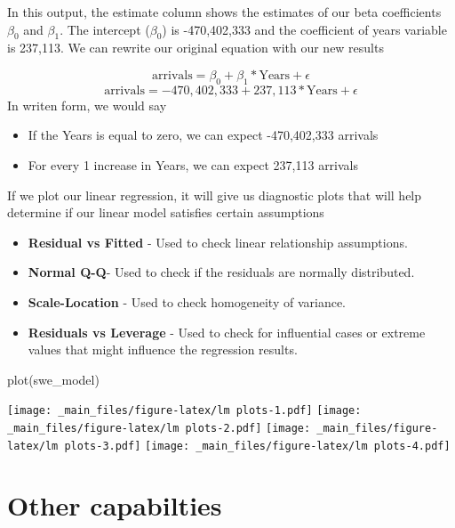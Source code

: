 \documentclass[
]{book}
\newenvironment{Shaded}{\begin{snugshade}}{\end{snugshade}}
\newcommand{\FunctionTok}[1]{\textcolor[rgb]{0.00,0.00,0.00}{#1}}
\newcommand{\NormalTok}[1]{#1}
\providecommand{\tightlist}{%
  \setlength{\itemsep}{0pt}\setlength{\parskip}{0pt}}
\begin{document}
In this output, the estimate column shows the estimates of our beta coefficients \(\beta_0\) and \(\beta_1\).
The intercept (\(\beta_0\)) is -470,402,333 and the coefficient of years variable is 237,113. We can rewrite our original equation with our new results

\[\text{arrivals} = \beta_{0} + \beta_{1}*\text{Years} + \epsilon\]
\[\text{arrivals} = -470,402,333 + 237,113*\text{Years} + \epsilon\]
In writen form, we would say

\begin{itemize}
\tightlist
\item
  If the Years is equal to zero, we can expect -470,402,333 arrivals
\item
  For every 1 increase in Years, we can expect 237,113 arrivals
\end{itemize}

If we plot our linear regression, it will give us diagnostic plots that will help determine if our linear model satisfies certain assumptions

\begin{itemize}
\item
  \textbf{Residual vs Fitted} - Used to check linear relationship assumptions.
\item
  \textbf{Normal Q-Q}- Used to check if the residuals are normally distributed.
\item
  \textbf{Scale-Location} - Used to check homogeneity of variance.
\item
  \textbf{Residuals vs Leverage} - Used to check for influential cases or extreme values that might influence the regression results.
\end{itemize}

\begin{Shaded}
\begin{Highlighting}[]
\FunctionTok{plot}\NormalTok{(swe\_model)}
\end{Highlighting}
\end{Shaded}

\texttt{[image: \_main\_files/figure-latex/lm plots-1.pdf]} \texttt{[image: \_main\_files/figure-latex/lm plots-2.pdf]} \texttt{[image: \_main\_files/figure-latex/lm plots-3.pdf]} \texttt{[image: \_main\_files/figure-latex/lm plots-4.pdf]}

\hypertarget{other-capabilties}{%
\chapter{Other capabilties}\label{other-capabilties}}
\end{document}
